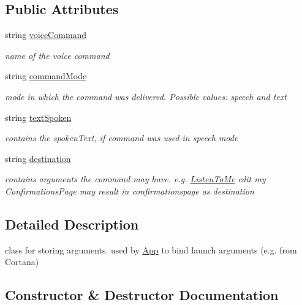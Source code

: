 \subsection*{Public Attributes}
\begin{DoxyCompactItemize}
\item 
string \mbox{\hyperlink{class_listen_to_me_1_1_model_1_1_listen_to_me_voice_command_ac1ab4ff605dddd6dfe7f038e46cf522e}{voice\+Command}}
\begin{DoxyCompactList}\small\item\em name of the voice command \end{DoxyCompactList}\item 
string \mbox{\hyperlink{class_listen_to_me_1_1_model_1_1_listen_to_me_voice_command_a6243f032e7b44a3de833ae4362150b53}{command\+Mode}}
\begin{DoxyCompactList}\small\item\em mode in which the command was delivered. Possible values\+: speech and text \end{DoxyCompactList}\item 
string \mbox{\hyperlink{class_listen_to_me_1_1_model_1_1_listen_to_me_voice_command_af82e41e09f7b7888d1ce9f6a0fa9ada8}{text\+Spoken}}
\begin{DoxyCompactList}\small\item\em contains the spoken\+Text, if command was used in speech mode \end{DoxyCompactList}\item 
string \mbox{\hyperlink{class_listen_to_me_1_1_model_1_1_listen_to_me_voice_command_a2d2a8120188ed1a16fefbb2461ab20f2}{destination}}
\begin{DoxyCompactList}\small\item\em contains arguments the command may have. e.\+g. \mbox{\hyperlink{namespace_listen_to_me}{Listen\+To\+Me}} edit my Confirmations\+Page may result in confirmationspage as destination \end{DoxyCompactList}\end{DoxyCompactItemize}


\subsection{Detailed Description}
class for storing arguments. used by \mbox{\hyperlink{class_listen_to_me_1_1_app}{App}} to bind launch arguments (e.\+g. from Cortana) 



\subsection{Constructor \& Destructor Documentation}
\mbox{\label{class_listen_to_me_1_1_model_1_1_listen_to_me_voice_command_a3da9ccddfb33c7b23eb9ae0ca4c9b39c}} 
